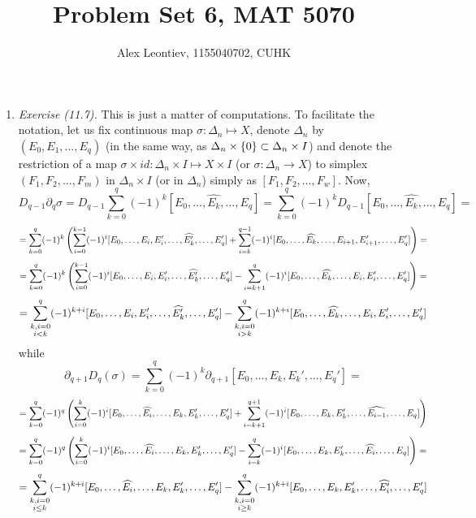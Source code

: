 \documentclass[8pt]{article} %
\title{Problem Set 6, MAT 5070}
\author{Alex Leontiev, 1155040702, CUHK}
\begin{document}
\maketitle
\begin{enumerate}[label=\bfseries \arabic*.]
	\item{{\it Exercise (11.7).} This is just a matter of computations. To facilitate the notation, let us fix continuous
		map $\sigma:\Delta_n\mapsto X$,
		denote $\Delta_n$ by $(E_0,E_1,\dots,E_q)$ (in the same way, as $\Delta_n\times\left\{0\right\}\subset\Delta_n\times I$) and denote
		the restriction of a map $\sigma\times id:\Delta_n\times I\mapsto X\times I$ (or $\sigma:\Delta_n\to X$) to simplex
		$(F_1,F_2,\dots,F_m)$ in $\Delta_n\times I$ (or in $\Delta_n$) simply as $[F_1,F_2,\dots,F_w]$. Now,
		\[D_{q-1}\partial_q\sigma=D_{q-1}\sum_{k=0}^q(-1)^k[E_0,\hdots,\widehat{E_k},\hdots,E_q]=\sum_{k=0}^q(-1)^kD_{q-1}
		[E_0,\hdots,\widehat{E_k},\hdots,E_q]=\]
		\[=\sum_{k=0}^q(-1)^k\mybra{\sum_{i=0}^{k-1}(-1)^i[E_0,\dots,E_i,E_i',\dots,\widehat{E_{k}'},\dots,E_q']+
		\sum_{i=k}^{q-1}(-1)^i [E_0,\dots,\widehat{E_{k}},\dots,E_{i+1},E_{i+1}',\dots,E_q']}=\]
		\[=\sum_{k=0}^q(-1)^k\mybra{\sum_{i=0}^{k-1}(-1)^i[E_0,\dots,E_i,E_i',\dots,\widehat{E_{k}'},\dots,E_q']-
		\sum_{i=k+1}^{q}(-1)^i [E_0,\dots,\widehat{E_{k}},\dots,E_{i},E_{i}',\dots,E_q']}=\]
		\[=\sum_{\begin{subarray}{c}k,i=0\\i< k\end{subarray}}^q(-1)^{k+i}[E_0,\dots,E_i,E_i',\dots,\widehat{E_{k}'},\dots,E_q']-
		\sum_{\begin{subarray}{c}k,i=0\\i>k\end{subarray}}^q(-1)^{k+i}[E_0,\dots,\widehat{E_{k}},\dots,E_{i},E_{i}',\dots,E_q']\]
		while \[\partial_{q+1}D_q(\sigma)=\sum_{k=0}^q(-1)^k\partial_{q+1}[E_0,\dots,E_k,E_k',\dots,E_q']=\]
		\[=\sum_{k=0}^q(-1)^q\mybra{\sum_{i=0}^k(-1)^i[E_0,\dots,\widehat{E_i},\dots,E_k,E_k',\dots,E_q']+\sum_{i=k+1}^{q+1}
		(-1)^i[E_0,\dots,E_k,E_k',\dots,\widehat{E_{i-1}},\dots,E_q]}\]
		\[=\sum_{k=0}^q(-1)^q\mybra{\sum_{i=0}^k(-1)^i[E_0,\dots,\widehat{E_i},\dots,E_k,E_k',\dots,E_q']-\sum_{i=k}^{q}
		(-1)^i[E_0,\dots,E_k,E_k',\dots,\widehat{E_{i}},\dots,E_q]}=\]
		\[=\sum_{\begin{subarray}{c}k,i=0\\i\leq k\end{subarray}}^q(-1)^{k+i}[E_0,\dots,\widehat{E_i},\dots,E_k,E_k',\dots,E_q']-
		\sum_{\begin{subarray}{c}k,i=0\\i\geq k\end{subarray}}^q(-1)^{k+i}[E_0,\dots,E_k,E_k',\dots,\widehat{E_{i}'},\dots,E_q']\]
}
\end{enumerate}
\end{document}
